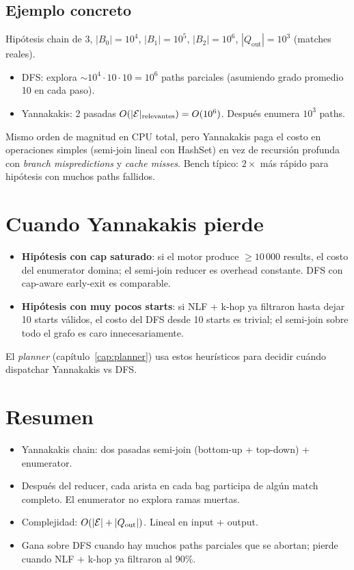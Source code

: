 \subsection{Ejemplo concreto}

Hipótesis chain de 3, \(|B_0| = 10^4\), \(|B_1| = 10^5\), \(|B_2|
= 10^6\), \(|Q_{\text{out}}| = 10^3\) (matches reales).

\begin{itemize}
    \item DFS: explora \(\sim 10^4 \cdot 10 \cdot 10 = 10^6\) paths
    parciales (asumiendo grado promedio 10 en cada paso).
    \item Yannakakis: 2 pasadas \(O(|\mathcal{E}|_{\text{relevantes}}) =
    O(10^6)\). Después enumera \(10^3\) paths.
\end{itemize}

\noindent
Mismo orden de magnitud en CPU total, pero Yannakakis paga el costo
en operaciones simples (semi-join lineal con HashSet) en vez de
recursión profunda con \emph{branch mispredictions} y
\emph{cache misses}. Bench típico: \(2\times\) más rápido para
hipótesis con muchos paths fallidos.

\section{Cuando Yannakakis pierde}

\begin{itemize}
    \item \textbf{Hipótesis con cap saturado}: si el motor produce
    \(\geq 10\,000\) results, el costo del enumerator domina; el
    semi-join reducer es overhead constante. DFS con cap-aware
    early-exit es comparable.
    \item \textbf{Hipótesis con muy pocos starts}: si NLF + k-hop
    ya filtraron hasta dejar 10 starts válidos, el costo del DFS
    desde 10 starts es trivial; el semi-join sobre todo el grafo
    es caro innecesariamente.
\end{itemize}

\noindent
El \emph{planner} (capítulo~\ref{cap:planner}) usa estos
heurísticos para decidir cuándo dispatchar Yannakakis vs DFS.

\section{Resumen}

\begin{itemize}
    \item Yannakakis chain: dos pasadas semi-join (bottom-up +
    top-down) + enumerator.
    \item Después del reducer, cada arista en cada bag participa
    de algún match completo. El enumerator no explora ramas muertas.
    \item Complejidad: \(O(|\mathcal{E}| + |Q_{\text{out}}|)\). Lineal en
    input + output.
    \item Gana sobre DFS cuando hay muchos paths parciales que se
    abortan; pierde cuando NLF + k-hop ya filtraron al 90\%.
\end{itemize}

